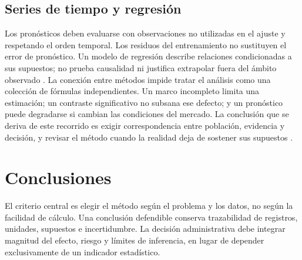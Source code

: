 {\subsection{Series de tiempo y regresión}
Los pronósticos deben evaluarse con observaciones no utilizadas en el ajuste y respetando el orden temporal. Los residuos del entrenamiento no sustituyen el error de pronóstico. Un modelo de regresión describe relaciones condicionadas a sus supuestos; no prueba causalidad ni justifica extrapolar fuera del ámbito observado \citep{hyndmanForecasting2021}.
La conexión entre métodos impide tratar el análisis como una colección de fórmulas independientes. Un marco incompleto limita una estimación; un contraste significativo no subsana ese defecto; y un pronóstico puede degradarse si cambian las condiciones del mercado. La conclusión que se deriva de este recorrido es exigir correspondencia entre población, evidencia y decisión, y revisar el método cuando la realidad deja de sostener sus supuestos \citep{holmesBusiness2023,nistHandbook,hyndmanForecasting2021}.
\section{Conclusiones}
El criterio central es elegir el método según el problema y los datos, no según la facilidad de cálculo. Una conclusión defendible conserva trazabilidad de registros, unidades, supuestos e incertidumbre. La decisión administrativa debe integrar magnitud del efecto, riesgo y límites de inferencia, en lugar de depender exclusivamente de un indicador estadístico.
}
